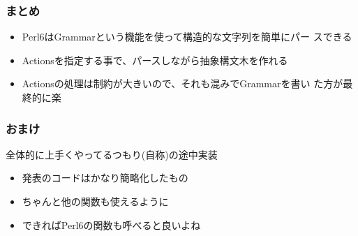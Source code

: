 \documentclass[14pt,dvipdfm,trans]{beamer}
\begin{document}
\begin{frame}
 \frametitle{まとめ}
 \pause
 \begin{itemize}
  \item <2-> Perl6はGrammarという機能を使って構造的な文字列を簡単にパー
	スできる
  \item <3-> Actionsを指定する事で、パースしながら抽象構文木を作れる
  \item <4-> Actionsの処理は制約が大きいので、それも混みでGrammarを書い
	た方が最終的に楽
 \end{itemize}
\end{frame}

\begin{frame}
\frametitle{おまけ}
 全体的に上手くやってるつもり(自称)の途中実装\\

\vspace*{1zh}
\begin{itemize}
 \item <3-> 発表のコードはかなり簡略化したもの
 \item <4-> ちゃんと他の関数も使えるように
 \item <5-> できればPerl6の関数も呼べると良いよね
\end{itemize}
\vspace{3zh}
 \hspace{18zh} 
\end{frame}
\end{document}
